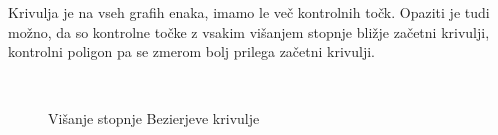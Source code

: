 \documentclass[isrm2, tisk]{fmfdelo}
\begin{document}
    Krivulja je na vseh grafih enaka, imamo le več kontrolnih točk.
    Opaziti je tudi možno, da so kontrolne točke z vsakim višanjem stopnje bližje začetni krivulji, kontrolni poligon pa se zmerom bolj prilega začetni krivulji.
    \begin{figure}[h]
        \centering
        \qquad
         \\
        \qquad
        \caption{Višanje stopnje Bezierjeve krivulje}
        \label{fig:višanje}
    \end{figure}
\end{document}
